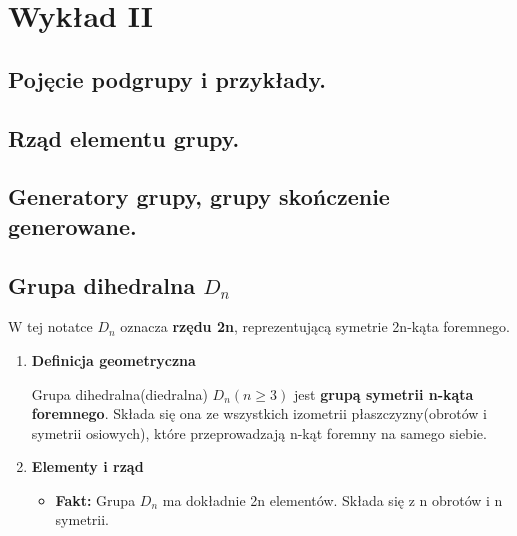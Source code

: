 \chapter{Wykład II}
\section{Pojęcie podgrupy i przykłady. }

\section{Rząd elementu grupy.}
\section{Generatory grupy, grupy skończenie generowane.}
\section{Grupa dihedralna $D_{n}$}

\begin{context}[Notacja]
	W tej notatce $D_{n}$ oznacza \textbf{rzędu 2n}, reprezentującą symetrie 2n-kąta foremnego.
\end{context}
\begin{enumerate}[label=\arabic*.]
	\item \textbf{Definicja geometryczna} 
		
		Grupa dihedralna(diedralna) $D_{n}\left( n\ge 3 \right)$ jest \textbf{grupą symetrii n-kąta foremnego}. Składa się ona ze wszystkich izometrii płaszczyzny(obrotów i symetrii osiowych), które przeprowadzają n-kąt foremny na samego siebie.
	\item \textbf{Elementy i rząd}

		\begin{itemize}
			\item \textbf{Fakt:} Grupa $D_{n}$ ma dokładnie 2n elementów. Składa się z n obrotów i n symetrii.  
		\end{itemize}
\end{enumerate}

